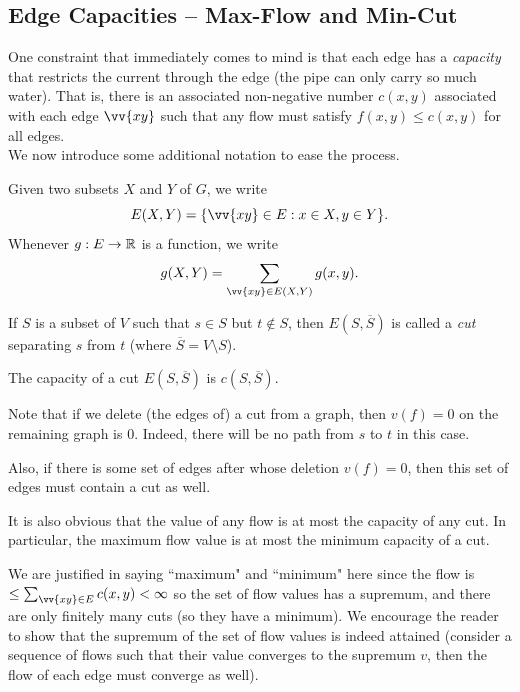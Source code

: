 \subsection{Edge Capacities -- Max-Flow and Min-Cut}

One constraint that immediately comes to mind is that each edge has a \textit{capacity} that restricts the current through the edge (the pipe can only carry so much water). That is, there is an associated non-negative number $c(x,y)$ associated with each edge $\vv{xy}$ such that any flow must satisfy $f(x,y)\leq c(x,y)$ for all edges. \\

We now introduce some additional notation to ease the process.
\begin{definition}
Given two subsets $X$ and $Y$ of $G$, we write
\[ E(X,Y)=\{\vv{xy}\in E:x\in X, y\in Y\}. \]
Whenever $g:E\to\mathbb{R}$ is a function, we write
\[ g(X,Y)=\sum_{\vv{xy}\in E(X,Y)} g(x,y). \]
\end{definition}

\begin{fdef}
If $S$ is a subset of $V$ such that $s\in S$ but $t\not\in S$, then $E(S,\overline{S})$ is called a \textit{cut} separating $s$ from $t$ (where $\overline{S}=V\setminus S$).
\end{fdef}

The capacity of a cut $E(S,\overline{S})$ is $c(S,\overline{S})$.

Note that if we delete (the edges of) a cut from a graph, then $v(f)=0$ on the remaining graph is $0$. Indeed, there will be no path from $s$ to $t$ in this case.

Also, if there is some set of edges after whose deletion $v(f)=0$, then this set of edges must contain a cut as well.

It is also obvious that the value of any flow is at most the capacity of any cut. In particular, the maximum flow value is at most the minimum capacity of a cut.

\vspace{1mm}
We are justified in saying ``maximum" and ``minimum" here since the flow is $\leq\sum_{\vv{xy}\in E}c(x,y)<\infty$ so the set of flow values has a supremum, and there are only finitely many cuts (so they have a minimum). We encourage the reader to show that the supremum of the set of flow values is indeed attained (consider a sequence of flows such that their value converges to the supremum $v$, then the flow of each edge must converge as well).

